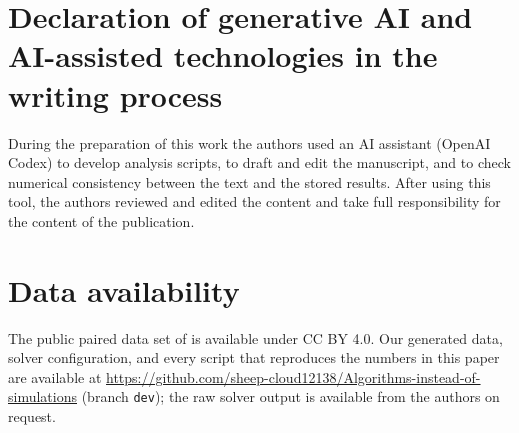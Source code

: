 \documentclass[preprint,11pt,a4paper,times,doubleblind]{elsarticle}
\begin{document}
\section*{Declaration of generative AI and AI-assisted technologies in the writing process}
During the preparation of this work the authors used an AI assistant (OpenAI Codex) to develop
analysis scripts, to draft and edit the manuscript, and to check numerical consistency between the
text and the stored results. After using this tool, the authors reviewed and edited the content and
take full responsibility for the content of the publication.

\section*{Data availability}
The public paired data set of \citet{menglik2026neural} is available under CC BY 4.0. Our
generated data, solver configuration, and every script that reproduces the numbers in this paper
are available at
\url{https://github.com/sheep-cloud12138/Algorithms-instead-of-simulations} (branch \texttt{dev});
the raw solver output is available from the authors on request.



\end{document}
